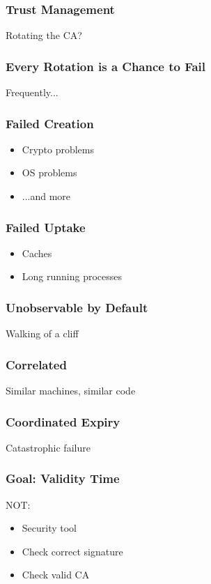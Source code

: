 \begin{frame}
\frametitle{Trust Management}

Rotating the CA?

\end{frame}

\begin{frame}
\frametitle{Every Rotation is a Chance to Fail}

Frequently...

\end{frame}


\begin{frame}
\frametitle{Failed Creation}
\begin{itemize}
\item Crypto problems
\item OS problems
\item ...and more
\end{itemize}
\end{frame}

\begin{frame}
\frametitle{Failed Uptake}
\begin{itemize}
\item Caches
\item Long running processes
\end{itemize}
\end{frame}


\begin{frame}
\frametitle{Unobservable by Default}
Walking of a cliff
\end{frame}

\begin{frame}
\frametitle{Correlated}
Similar machines, similar code
\end{frame}

\begin{frame}
\frametitle{Coordinated Expiry}

Catastrophic failure
\end{frame}

\begin{frame}
\frametitle{Goal: Validity Time}

NOT:

\begin{itemize}
\item Security tool
\item Check correct signature
\item Check valid CA
\end{itemize}
\end{frame}

